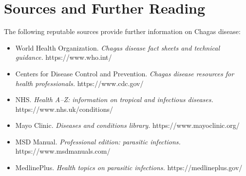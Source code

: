 \section*{Sources and Further Reading}
The following reputable sources provide further information on Chagas disease:
\begin{itemize}
    \item World Health Organization. \textit{Chagas disease fact sheets and technical guidance.} https://www.who.int/
    \item Centers for Disease Control and Prevention. \textit{Chagas disease resources for health professionals.} https://www.cdc.gov/
    \item NHS. \textit{Health A--Z: information on tropical and infectious diseases.} https://www.nhs.uk/conditions/
    \item Mayo Clinic. \textit{Diseases and conditions library.} https://www.mayoclinic.org/
    \item MSD Manual. \textit{Professional edition: parasitic infections.} https://www.msdmanuals.com/
    \item MedlinePlus. \textit{Health topics on parasitic infections.} https://medlineplus.gov/
\end{itemize}
